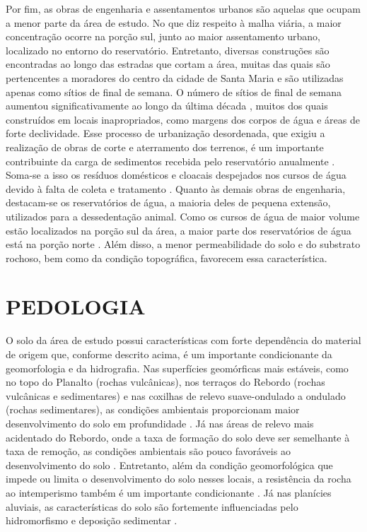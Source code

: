Por fim, as obras de engenharia e assentamentos urbanos são aquelas que ocupam a menor parte da área de 
estudo. No que diz respeito à malha viária, a maior concentração ocorre na porção sul, junto ao maior 
assentamento urbano, localizado no entorno do reservatório. Entretanto, diversas construções são encontradas 
ao longo das estradas que cortam a área, muitas das quais são pertencentes a moradores do centro da cidade de 
Santa Maria e são utilizadas apenas como sítios de final de semana. O número de sítios de final de semana 
aumentou significativamente ao longo da última década \cite{Goldani2006}, muitos dos quais construídos em 
locais inapropriados, como margens dos corpos de água e áreas de forte declividade. Esse processo de 
urbanização desordenada, que exigiu a realização de obras de corte e aterramento dos terrenos, é um importante 
contribuinte da carga de sedimentos recebida pelo reservatório anualmente \cite{PaivaEtAl2001, DillEtAl2004, 
MiguelEtAl2014}. Soma-se a isso os resíduos domésticos e cloacais despejados nos cursos de água devido à falta 
de coleta e tratamento \cite{Goldani2006}. Quanto às demais obras de engenharia, destacam-se os reservatórios 
de água, a maioria deles de pequena extensão, utilizados para a dessedentação animal. Como os cursos de água 
de maior volume estão localizados na porção sul da área, a maior parte dos reservatórios de água está na 
porção norte \cite{SamuelRosaEtAl2011a}. Além disso, a menor permeabilidade do solo e do substrato rochoso, 
bem 
como da condição topográfica, favorecem essa característica.

\section{PEDOLOGIA}

O solo da área de estudo possui características com forte dependência do material de origem 
\cite{NascimentoEtAl2010} que, conforme descrito acima, é um importante condicionante da geomorfologia e da 
hidrografia. Nas superfícies geomórficas mais estáveis, como no topo do Planalto (rochas vulcânicas), nos 
terraços do Rebordo (rochas vulcânicas e sedimentares) e nas coxilhas de relevo suave-ondulado a ondulado 
(rochas sedimentares), as condições ambientais proporcionam maior desenvolvimento do solo em profundidade 
\cite{Moser1990}. Já nas áreas de relevo mais acidentado do Rebordo, onde a taxa de formação do solo deve ser 
semelhante à taxa de remoção, as condições ambientais são pouco favoráveis ao desenvolvimento do solo 
\cite{Moser1990, DalmolinEtAl2006a, Sturmer2008, SamuelRosaEtAl2011a}. Entretanto, além da condição 
geomorfológica que impede ou limita o desenvolvimento do solo nesses locais, a resistência da rocha ao 
intemperismo também é um importante condicionante \cite{Pedron2007}. Já nas planícies aluviais, as 
características do solo são fortemente influenciadas pelo hidromorfismo e deposição sedimentar 
\cite{Moser1990, Miguel2010}.

